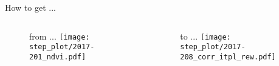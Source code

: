 \begin{frame}[t]{How to get ...}
    \begin{columns}
        \begin{column}{0.45\textwidth}
            \begin{figure}
                \large from ...
                \texttt{[image: step\_plot/2017-201\_ndvi.pdf]}
            \end{figure}
        \end{column}
        \begin{column}{0.45\textwidth}
            \begin{figure}
                \large to ...
                \texttt{[image: step\_plot/2017-208\_corr\_itpl\_rew.pdf]}
            \end{figure}
        \end{column}
    \end{columns}
\end{frame}
